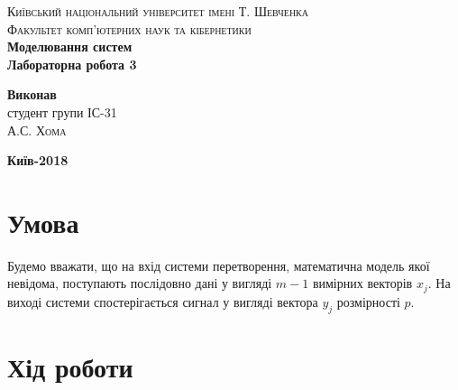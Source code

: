 \documentclass[12pt, a4paper]{article}
\begin{document}
\begin{titlepage}

\center

\textsc{\Large Київський національний університет імені Т. Шевченка \\
Факультет комп’ютерних наук та кібернетики}\\[7.5cm] 
	
	{\huge\bfseries Моделювання систем}\\[0.4cm]
	
	{\large\bfseries Лабораторна робота 3}\\[0.4cm]
	
    \vfill\vfill
	
	\begin{minipage}{0.8\textwidth}
		\begin{flushright}
			\large
			\textbf{Виконав}\\
			студент групи ІС-31 \\
			А.С. \textsc{Хома}
		\end{flushright}
	\end{minipage}

   \vfill
	
	{\large \textbf{ Київ-2018}} 

\end{titlepage}

\section*{Умова}

Будемо вважати, що на вхід системи перетворення, математична модель якої невідома, поступають послідовно дані у вигляді $m-1$  вимірних векторів $x_j$. На виході системи спостерігається сигнал у вигляді вектора $y_j$ розмірності $p$.

\begin{center}

\end{center}

\section*{Хід роботи}
\end{document}
